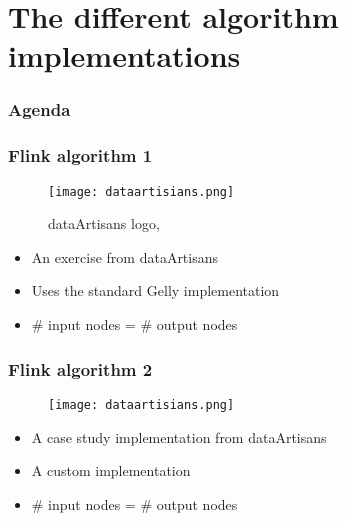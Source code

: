 \section{The different algorithm implementations}

\begin{frame}
\frametitle{Agenda}
\tableofcontents[currentsection]
\end{frame}


\begin{frame}
\frametitle{Flink algorithm 1}
\begin{figure}
	
	\texttt{[image: dataartisians.png]}
	\caption{dataArtisans logo, \cite{artisians}}
\end{figure}
\begin{itemize}
\item An exercise from dataArtisans
\item Uses the standard Gelly implementation
\item \# input nodes = \# output nodes
\end{itemize}
\end{frame}

\begin{frame}
\frametitle{Flink algorithm 2}
\begin{figure}
	
	\texttt{[image: dataartisians.png]}

\end{figure}

\begin{itemize}
\item A case study implementation from dataArtisans
\item A custom implementation
\item \# input nodes = \# output nodes
\end{itemize}
\end{frame}

